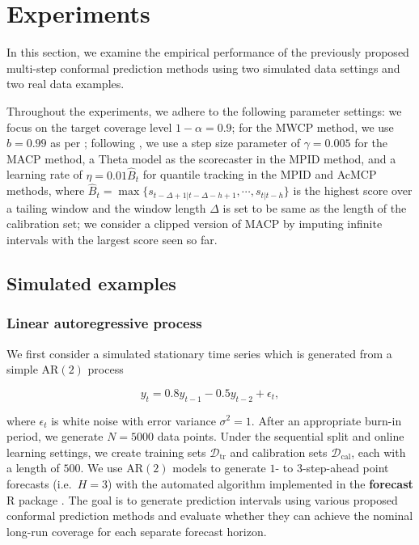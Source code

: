\documentclass[
  11pt,
  a4paper,
]{article}
\theoremstyle{plain}
\theoremstyle{remark}
\begin{document}
\section{Experiments}\label{experiments}

In this section, we examine the empirical performance of the previously
proposed multi-step conformal prediction methods using two simulated
data settings and two real data examples.

Throughout the experiments, we adhere to the following parameter
settings: we focus on the target coverage level \(1-\alpha=0.9\); for
the MWCP method, we use \(b=0.99\) as per \textcite{barber2023};
following \textcite{angelopoulos2024}, we use a step size parameter of
\(\gamma=0.005\) for the MACP method, a Theta model as the scorecaster
in the MPID method, and a learning rate of \(\eta=0.01\hat{B}_t\) for
quantile tracking in the MPID and AcMCP methods, where
\(\hat{B}_t=\max\{s_{t-\Delta+1|t-\Delta-h+1},\cdots,s_{t|t-h}\}\) is
the highest score over a tailing window and the window length \(\Delta\)
is set to be same as the length of the calibration set; we consider a
clipped version of MACP by imputing infinite intervals with the largest
score seen so far.

\subsection{Simulated examples}\label{simulated-examples}

\subsubsection{Linear autoregressive
process}\label{linear-autoregressive-process}

We first consider a simulated stationary time series which is generated
from a simple AR\((2)\) process

\[
y_t = 0.8y_{t-1} - 0.5y_{t-2} + \epsilon_t,
\]

where \(\epsilon_t\) is white noise with error variance
\(\sigma^2 = 1\). After an appropriate burn-in period, we generate
\(N=5000\) data points. Under the sequential split and online learning
settings, we create training sets \(\mathcal{D}_{\text{tr}}\) and
calibration sets \(\mathcal{D}_{\text{cal}}\), each with a length of
\(500\). We use AR\((2)\) models to generate \(1\)- to \(3\)-step-ahead
point forecasts (i.e.~\(H=3\)) with the automated algorithm implemented
in the \textbf{forecast} R package \autocite{hyndman2024}. The goal is
to generate prediction intervals using various proposed conformal
prediction methods and evaluate whether they can achieve the nominal
long-run coverage for each separate forecast horizon.
\end{document}
